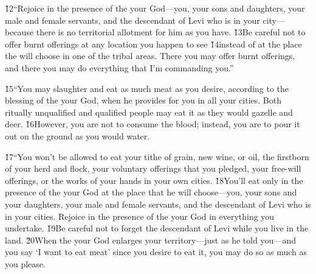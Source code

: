 \v{12}``Rejoice in the presence of the  your God---you, your sons and daughters, your male and female servants, and the descendant of Levi who is in your city---because there is no territorial allotment for him as you have. \v{13}Be careful not to offer burnt offerings at any location you happen to see \v{14}instead of at the place the  will choose in one of the tribal areas. There you may offer burnt offerings, and there you may do everything that I'm commanding you.''

\v{15}``You may slaughter and eat as much meat as you desire, according to the blessing of the  your God, when he provides for you in all your cities. Both ritually unqualified and qualified people may eat it as they would gazelle and deer. \v{16}However, you are not to consume the blood; instead, you are to pour it out on the ground as you would water.

\v{17}``You won't be allowed to eat your tithe of grain, new wine, or oil, the firstborn of your herd and flock, your voluntary offerings that you pledged, your free-will offerings, or the works of your hands in your own cities. \v{18}You'll eat only in the presence of the  your God at the place that he will choose---you, your sons and your daughters, your male and female servants, and the descendant of Levi who is in your cities. Rejoice in the presence of the  your God in everything you undertake. \v{19}Be careful not to forget the descendant of Levi while you live in the land. \v{20}When the  your God enlarges your territory---just as he told you---and you say `I want to eat meat' since you desire to eat it, you may do so as much as you please.

